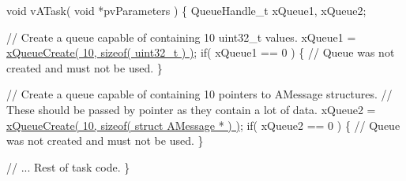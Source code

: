 \begin{DoxyPre}void vATask( void *pvParameters )
\{
QueueHandle\_t xQueue1, xQueue2;\end{DoxyPre}



\begin{DoxyPre}   // Create a queue capable of containing 10 uint32\_t values.
   xQueue1 = \hyperlink{vendor_2ceedling_2plugins_2freertos_2src_2freertos_2include_2queue_8h_aeb858b824bd74a934ea7ebb81af2a6bb}{xQueueCreate( 10, sizeof( uint32\_t ) )};
   if( xQueue1 == 0 )
   \{
    // Queue was not created and must not be used.
   \}\end{DoxyPre}



\begin{DoxyPre}   // Create a queue capable of containing 10 pointers to AMessage structures.
   // These should be passed by pointer as they contain a lot of data.
   xQueue2 = \hyperlink{vendor_2ceedling_2plugins_2freertos_2src_2freertos_2include_2queue_8h_aeb858b824bd74a934ea7ebb81af2a6bb}{xQueueCreate( 10, sizeof( struct AMessage * ) )};
   if( xQueue2 == 0 )
   \{
    // Queue was not created and must not be used.
   \}\end{DoxyPre}



\begin{DoxyPre}   // ... Rest of task code.
\}
\end{DoxyPre}
 
